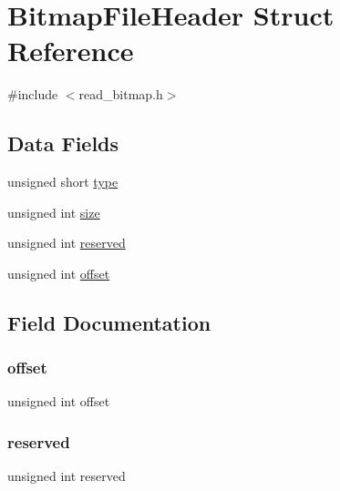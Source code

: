 \hypertarget{struct_bitmap_file_header}{}\section{Bitmap\+File\+Header Struct Reference}
\label{struct_bitmap_file_header}


{\ttfamily \#include $<$read\+\_\+bitmap.\+h$>$}

\subsection*{Data Fields}
\begin{DoxyCompactItemize}
\item 
unsigned short \hyperlink{struct_bitmap_file_header_aa929142c5ddf34cf0915c97a617a1a63}{type}
\item 
unsigned int \hyperlink{struct_bitmap_file_header_aac913b3a1f6ef005d66bf7a84428773e}{size}
\item 
unsigned int \hyperlink{struct_bitmap_file_header_a05d5cbcb44f437341bd9fa37d589aced}{reserved}
\item 
unsigned int \hyperlink{struct_bitmap_file_header_a29b5297d3393519050e3126c4cb07c1c}{offset}
\end{DoxyCompactItemize}


\subsection{Field Documentation}
\hypertarget{struct_bitmap_file_header_a29b5297d3393519050e3126c4cb07c1c}{}\label{struct_bitmap_file_header_a29b5297d3393519050e3126c4cb07c1c} 
\subsubsection{\texorpdfstring{offset}{offset}}
{\footnotesize\ttfamily unsigned int offset}

\hypertarget{struct_bitmap_file_header_a05d5cbcb44f437341bd9fa37d589aced}{}\label{struct_bitmap_file_header_a05d5cbcb44f437341bd9fa37d589aced} 
\subsubsection{\texorpdfstring{reserved}{reserved}}
{\footnotesize\ttfamily unsigned int reserved}

